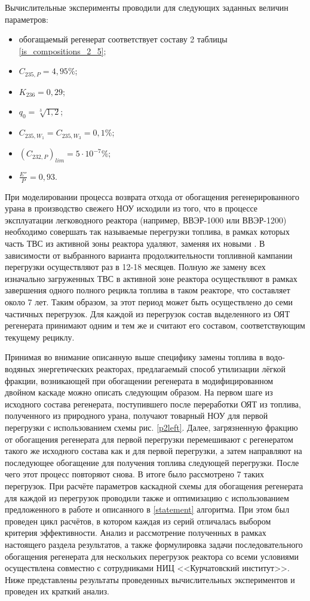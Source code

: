 Вычислительные эксперименты проводили для следующих заданных величин параметров: 

\begin{itemize}
    \item обогащаемый регенерат соответствует составу 2 таблицы \ref{is_compositions_2_5};
    \item $C_{235,{P}}=4,95\%$;
    \item $K_{236}=0,29$;
    \item $q_{0} = \sqrt[3]{1,2}$;
    \item $C_{235,{W_1}}=C_{235,{W_3}}=0,1\%$;
    \item ${(C_{232,P})}_{lim}=5\cdot10^{-7}\%$;
    \item $\frac{E''}{P}=0,93$.
\end{itemize}

При моделировании процесса возврата отхода от обогащения регенерированного урана в производство свежего НОУ исходили из того, что в процессе эксплуатации легководного реактора (например, ВВЭР-1000 или ВВЭР-1200) необходимо совершать так называемые перегрузки топлива, в рамках которых часть ТВС из активной зоны реактора удаляют, заменяя их новыми \cite{острейковскийEkspluataciyaAtomnyhStanciy1999}. В зависимости от выбранного варианта продолжительности топливной кампании перегрузки осуществляют раз в 12-18 месяцев. Полную же замену всех изначально загруженных ТВС в активной зоне реактора осуществляют в рамках завершения одного полного рецикла топлива в таком реакторе, что составляет около 7 лет. Таким образом, за этот период может быть осуществлено до семи частичных перегрузок. Для каждой из перегрузок состав выделенного из ОЯТ регенерата принимают одним и тем же и считают его составом, соответствующим текущему рециклу.

Принимая во внимание описанную выше специфику замены топлива в водо-водяных энергетических реакторах, предлагаемый способ утилизации лёгкой фракции, возникающей при обогащении регенерата в модифицированном двойном каскаде можно описать следующим образом. На первом шаге из исходного состава регенерата, поступившего после переработки ОЯТ из топлива, полученного из природного урана, получают товарный НОУ для первой перегрузки с использованием схемы рис. \ref{p2left}. Далее, загрязненную фракцию от обогащения регенерата для первой перегрузки перемешивают с регенератом такого же исходного состава как и для первой перегрузки, а затем направляют на последующее обогащение для получения топлива следующей перегрузки. После чего этот процесс повторяют снова. В итоге было рассмотрено 7 таких перегрузок. При расчёте параметров каскадной схемы для обогащения регенерата для каждой из перегрузок проводили также и оптимизацию с использованием предложенного в работе и описанного в \ref{statement} алгоритма. При этом был проведен цикл расчётов, в котором каждая из серий отличалась выбором критерия эффективности. Анализ и рассмотрение полученных в рамках настоящего раздела результатов, а также формулировка задачи последовательного обогащения регенерата для нескольких перегрузок реактора со всеми условиями осуществлена совместно с сотрудниками НИЦ <<Курчатовский институт>>. Ниже представлены результаты проведенных вычислительных экспериментов и проведен их краткий анализ.

